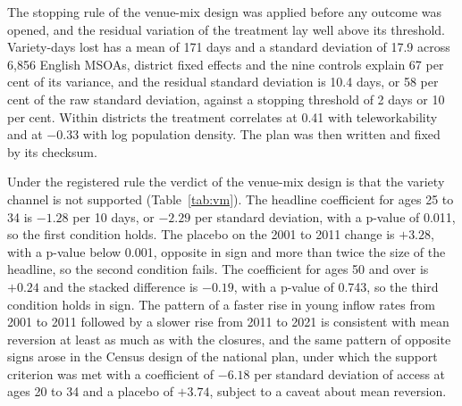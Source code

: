 \documentclass[11pt,a4paper]{article}
\begin{document}
The stopping rule of the venue-mix design was applied before any outcome was opened, and the residual variation of the treatment lay well above its threshold. Variety-days lost has a mean of 171 days and a standard deviation of 17.9 across 6,856 English MSOAs, district fixed effects and the nine controls explain 67 per cent of its variance, and the residual standard deviation is 10.4 days, or 58 per cent of the raw standard deviation, against a stopping threshold of 2 days or 10 per cent. Within districts the treatment correlates at 0.41 with teleworkability and at $-0.33$ with log population density. The plan was then written and fixed by its checksum.

Under the registered rule the verdict of the venue-mix design is that the variety channel is not supported (Table~\ref{tab:vm}). The headline coefficient for ages 25 to 34 is $-1.28$ per 10 days, or $-2.29$ per standard deviation, with a p-value of 0.011, so the first condition holds. The placebo on the 2001 to 2011 change is $+3.28$, with a p-value below 0.001, opposite in sign and more than twice the size of the headline, so the second condition fails. The coefficient for ages 50 and over is $+0.24$ and the stacked difference is $-0.19$, with a p-value of 0.743, so the third condition holds in sign. The pattern of a faster rise in young inflow rates from 2001 to 2011 followed by a slower rise from 2011 to 2021 is consistent with mean reversion at least as much as with the closures, and the same pattern of opposite signs arose in the Census design of the national plan, under which the support criterion was met with a coefficient of $-6.18$ per standard deviation of access at ages 20 to 34 and a placebo of $+3.74$, subject to a caveat about mean reversion.
\end{document}

